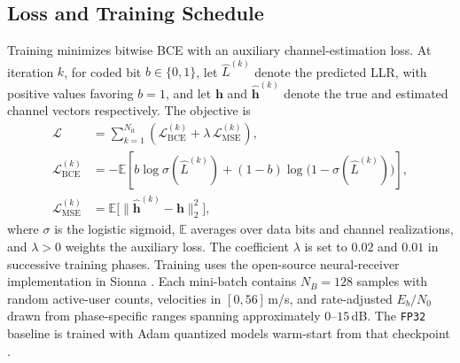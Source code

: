 \vspace{-2mm}

\subsection{Loss and Training Schedule}
\label{sec:loss}
Training minimizes bitwise \gls{BCE} with an auxiliary
channel-estimation loss. At iteration $k$, for coded bit $b\in\{0,1\}$,
let $\hat{L}^{(k)}$ denote the predicted \gls{LLR}, with positive
values favoring $b=1$, and let $\mathbf{h}$ and $\hat{\mathbf{h}}^{(k)}$
denote the true and estimated channel vectors respectively. The objective is
\begin{align}
  \label{eq:total_loss}
    \mathcal{L}
    &= \sum_{k=1}^{N_{\mathrm{it}}}
       \left(
         \mathcal{L}_{\mathrm{BCE}}^{(k)}
         + \lambda\,\mathcal{L}_{\mathrm{MSE}}^{(k)}
       \right), \\
  \label{eq:bce}
    \mathcal{L}_{\mathrm{BCE}}^{(k)}
    &= -\mathbb{E}\!\left[
         b\log\sigma(\hat{L}^{(k)})
         +(1-b)\log\!\bigl(1-\sigma(\hat{L}^{(k)})\bigr)
       \right], \\
  \label{eq:mse}
    \mathcal{L}_{\mathrm{MSE}}^{(k)}
    &= \mathbb{E}\!\bigl[
         \|\hat{\mathbf{h}}^{(k)}-\mathbf{h}\|_{2}^{2}
       \bigr],
  \end{align}
where $\sigma$ is the logistic sigmoid, $\mathbb{E}$ averages over data
bits and channel realizations, and $\lambda>0$ weights the auxiliary
loss. The coefficient $\lambda$ is set to $0.02$ and $0.01$ in
successive training phases. Training uses the open-source
neural-receiver implementation in Sionna \cite{sionna,neural_rx}.
Each mini-batch contains $N_B{=}128$ samples with random active-user
counts, velocities in $[0,56]$\,m/s, and rate-adjusted $E_b/N_0$ drawn
from phase-specific ranges spanning approximately $0$--$15$\,dB. The
\texttt{FP32} baseline is trained with Adam quantized models
warm-start from that checkpoint \cite{kingma2014adam}.

